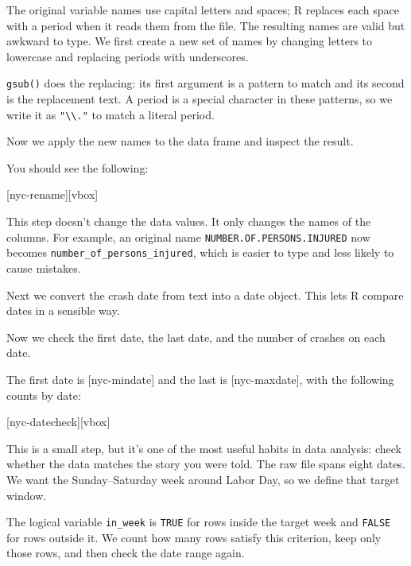 The original variable names use capital letters and spaces; R replaces
each space with a period when it reads them from the file. The
resulting names are valid but awkward to type. We first create a new
set of names by changing letters to lowercase and replacing periods
with underscores.


\lstinline{gsub()} does the replacing: its first argument is a pattern
to match and its second is the replacement text. A period is a
special character in these patterns, so we write it as
\lstinline{"\\."} to match a literal period.

Now we apply the new names to the data frame and inspect the result.


You should see the following:

[nyc-rename][vbox]

This step doesn't change the data values. It only changes the names of
the columns. For example, an original name \lstinline{NUMBER.OF.PERSONS.INJURED}
now becomes
\lstinline{number_of_persons_injured}, which is easier to type and less
likely to cause mistakes.

Next we convert the crash date from text into a date object. This lets R
compare dates in a sensible way.


Now we check the first date, the last date, and the number of crashes on
each date.


The first date is [nyc-mindate]
and the last is [nyc-maxdate],
with the following counts by date:

[nyc-datecheck][vbox]

This is a small step, but it's one of the most useful habits in data
analysis: check whether the data matches the story you were told. The raw
file spans eight dates. We want the Sunday--Saturday week around Labor
Day, so we define that target window.


The logical variable \lstinline{in_week} is \lstinline{TRUE} for rows inside
the target week and \lstinline{FALSE} for rows outside it. We count how
many rows satisfy this criterion, keep only those rows, and then check the date
range again.

